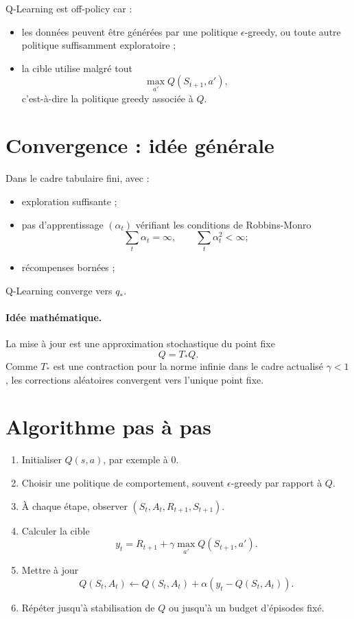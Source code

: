 \documentclass[11pt,a4paper]{article}
\begin{document}
Q-Learning est off-policy car :
\begin{itemize}[leftmargin=1.6em]
    \item les données peuvent être générées par une politique $\epsilon$-greedy, ou toute autre politique suffisamment exploratoire ;
    \item la cible utilise malgré tout
    \[
    \max_{a'}Q(S_{t+1},a'),
    \]
    c'est-à-dire la politique greedy associée à $Q$.
\end{itemize}

\section{Convergence : idée générale}

Dans le cadre tabulaire fini, avec :
\begin{itemize}[leftmargin=1.6em]
    \item exploration suffisante ;
    \item pas d'apprentissage $(\alpha_t)$ vérifiant les conditions de Robbins-Monro
    \[
    \sum_t \alpha_t = \infty,
    \qquad
    \sum_t \alpha_t^2 < \infty ;
    \]
    \item récompenses bornées ;
\end{itemize}
Q-Learning converge vers $q_*$.

\paragraph{Idée mathématique.}
La mise à jour est une approximation stochastique du point fixe
\[
Q=T_*Q.
\]
Comme $T_*$ est une contraction pour la norme infinie dans le cadre actualisé $\gamma<1$, les corrections aléatoires convergent vers l'unique point fixe.

\section{Algorithme pas à pas}

\begin{enumerate}[leftmargin=1.8em]
    \item Initialiser $Q(s,a)$, par exemple à $0$.
    \item Choisir une politique de comportement, souvent $\epsilon$-greedy par rapport à $Q$.
    \item À chaque étape, observer $(S_t,A_t,R_{t+1},S_{t+1})$.
    \item Calculer la cible
    \[
    y_t = R_{t+1}+\gamma \max_{a'} Q(S_{t+1},a').
    \]
    \item Mettre à jour
    \[
    Q(S_t,A_t)\leftarrow Q(S_t,A_t)+\alpha(y_t-Q(S_t,A_t)).
    \]
    \item Répéter jusqu'à stabilisation de $Q$ ou jusqu'à un budget d'épisodes fixé.
\end{enumerate}
\end{document}
